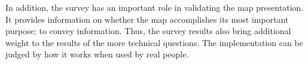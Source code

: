 In addition,
the survey has an important role in validating the map presentation.
It provides information on whether the map accomplishes its most important purpose;
to convey information.
Thus,
the survey results also bring additional weight to the results of the more technical questions.
The implementation can be judged by how it works when used by real people.









